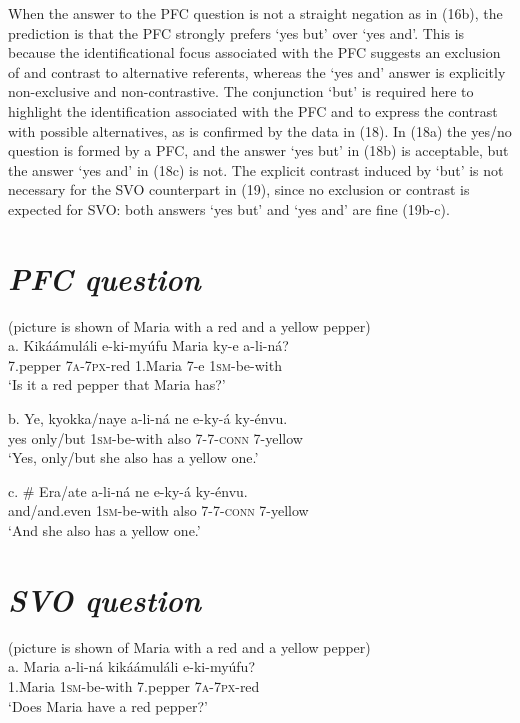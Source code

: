 \documentclass[output=paper]{langsci/langscibook}
\begin{document}
When the answer to the PFC question is not a straight negation as in (16b), the prediction is that the PFC strongly prefers ‘yes but’ over ‘yes and’. This is because the identificational focus associated with the PFC suggests an exclusion of and contrast to alternative referents, whereas the ‘yes and’ answer is explicitly non-exclusive and non-contrastive. The conjunction ‘but’ is required here to highlight the identification associated with the PFC and to express the contrast with possible alternatives, as is confirmed by the data in (18). In (18a) the yes/no question is formed by a PFC, and the answer ‘yes but’ in (18b) is acceptable, but the answer ‘yes and’ in (18c) is not. The explicit contrast induced by ‘but’ is not necessary for the SVO counterpart in (19), since no exclusion or contrast is expected for SVO: both answers ‘yes but’ and ‘yes and’ are fine (19b-c).

\chapter[PFC question]{\textit{PFC question}}
     (picture is shown of Maria with a red and a yellow pepper)\\
\gll   a.  Kikáámuláli  e-ki-myúfu  Maria    ky-e  a-li-ná?\\
         7.pepper  \textsc{7a}{}-\textsc{7px}{}-red  1.Maria  7-e  \textsc{1sm}{}-be-with\\
\glt     ‘Is it a red pepper that Maria has?’
\z

\gll   b.  Ye,  kyokka/naye  a-li-ná  ne  e-ky-á    ky-énvu.\\
         yes  only/but  \textsc{1sm}{}-be-with  also  \textsc{7}{}-\textsc{7}{}-\textsc{conn}  7-yellow\\
\glt     ‘Yes, only/but she also has a yellow one.’
\z

\gll   c.  \# Era/ate  a-li-ná  ne  e-ky-á    ky-énvu.\\
         and/and.even  \textsc{1sm}{}-be-with  also  \textsc{7}{}-\textsc{7}{}-\textsc{conn}  7-yellow\\
\glt     ‘And she also has a yellow one.’
\z

\chapter[SVO question]{\textit{SVO question}}
       (picture is shown of Maria with a red and a yellow pepper)\\
\gll   a.  Maria    a-li-ná  kikáámuláli  e-ki-myúfu?\\
         1.Maria  \textsc{1sm}{}-be-with  7.pepper  \textsc{7a}{}-\textsc{7px}{}-red\\
\glt     ‘Does Maria have a red pepper?’
\z
\end{document}
